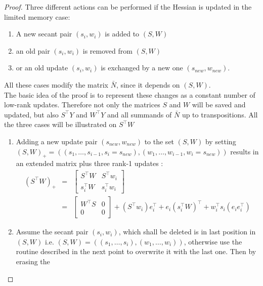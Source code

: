 \documentclass{svmult}
\begin{document}
\begin{proof}
	Three different actions can be performed if the Hessian is updated in the limited memory case:
	\begin{enumerate}
		\item A new secant pair $(s_i,w_i)$ is added to $(S,W)$
		\item an old pair $(s_i,w_i)$ is removed from $(S,W)$
		\item or an old update $(s_i,w_i)$ is exchanged by a new one $(s_{new},w_{new})$.
	\end{enumerate}
	All these cases modify the matrix $\bar{N}$, since it depends on $(S,W)$.\\
	The basic idea of the proof is to represent these changes as a constant number of low-rank updates. Therefore not only the matrices
	$S$ and $W$ will be saved and updated, but also $S^{\top}Y$ and $W^{\top}Y$ and all summands of $\bar{N}$ up to transpositions.	All the three cases will be illustrated on $S^{\top}W$
	\begin{enumerate}
		\item Adding a new update  pair $(s_{new},w_{new})$ to the set $(S,W)$ by setting $(S,W)_+= 
				((s_1,\dots,s_{i-1},s_i=s_{new}),(w_1,\dots,w_{i-1},w_i=s_{new}))$ 	
			results in an extended matrix plus three rank-1 updates :
			\begin{eqnarray*}
				(S^{\top}W)_+&=&\left[\begin{array}{cc}  
					S^{\top}W & S^{\top}w_i\\
					s_i^{\top}W & s_i^{\top}w_i
				\end{array}\right] \\
				&=&\left[\begin{array}{cc}
					W^{\top}S & 0\\
					0 & 0 
				\end{array}\right]
				+(S^{\top}w_i)e_i^{\top}+ e_i (s_i^{\top}W)^{\top} + w_i^{\top}s_i (e_i e_i^{\top})
			\end{eqnarray*}
		\item Assume the secant pair $(s_i,w_i)$, which shall be deleted is in last position in $(S,W)$ i.e. $(S,W) = ( (s_1,\dots,s_i) , 	
			(w_1,\dots,w_i) )$, otherwise use the routine described in the next point to overwrite it with the last one. Then by erasing the 

\end{enumerate}
\end{proof}
\end{document}
